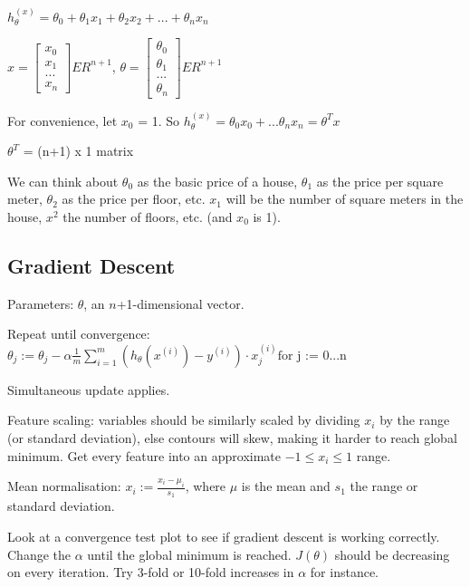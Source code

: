 \documentclass[12pt, a4paper]{article}
\begin{document}
  $h_\theta^{(x)} = \theta_0 + \theta_1x_1 + \theta_2x_2 + ... + 
    \theta_nx_n$

  $x = \begin{bmatrix} x_0 \\ x_1 \\ ... \\ x_n \end{bmatrix} ER^{n+1}$,
    $\theta = \begin{bmatrix} \theta_0 \\ \theta_1 \\ ... \\ \theta_n 
    \end{bmatrix} ER^{n+1}$

  For convenience, let $x_0$ = 1. So $h_\theta^{(x)} = \theta_0x_0 + ...
    \theta_nx_n = \theta^Tx$

  $\theta^T$ = (n+1) x 1 matrix 

  We can think about $\theta_0$ as the basic price of a house, $\theta_1$ 
    as the price per square meter, $\theta_2$ as the price per floor, etc. 
    $x_1$ will be the number of square meters in the house, $x^2$ the 
    number of floors, etc. (and $x_0$ is 1).

  \subsection{Gradient Descent}

    Parameters: $\theta$, an $n$+1-dimensional vector.

    Repeat until convergence: 
    $\theta_j := \theta_j - \alpha \frac{1}{m} \sum\limits_{i=1}^{m} 
      (h_\theta(x^{(i)}) - y^{(i)}) \cdot x_j^{(i)} \text{for j := 0...n}$
    
    Simultaneous update applies.

    Feature scaling: variables should be similarly scaled by dividing $x_i$
      by the range (or standard deviation), else contours will skew, making 
      it harder to reach global minimum. Get every feature into an 
      approximate $-1 \leq x_i \leq 1$ range. 
    
    Mean normalisation: $x_i := \frac{x_i - \mu_i}{s_1}$, where $\mu$ is
      the mean and $s_1$ the range or standard deviation.

    Look at a convergence test plot to see if gradient descent is working
      correctly. Change the $\alpha$ until the global minimum is reached. 
      $J(\theta)$ should be decreasing on every iteration. Try 3-fold or 
      10-fold increases in $\alpha$ for instance. 
\end{document}
